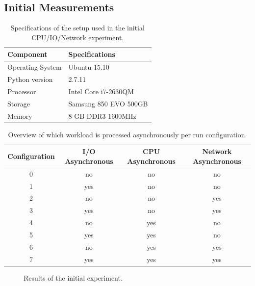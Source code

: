 \subsection{Initial Measurements}

\begin{table}[h]
	\centering
	\caption{Specifications of the setup used in the initial CPU/IO/Network experiment.}
	\label{table:setup_initial_experiment}
	\begin{tabular}{l|l}
		\textbf{Component} 	& \textbf{Specifications} \\ \hline
		Operating System   	& Ubuntu 15.10 \\
		Python version		& 2.7.11 \\
		Processor			& Intel Core i7-2630QM \\ 
		Storage				& Samsung 850 EVO 500GB  \\ 
		Memory				& 8 GB DDR3 1600MHz \\
	\end{tabular}
\end{table}

\begin{table}[]
	\centering
	\caption{Overview of which workload is processed asynchronously per run configuration.}
	\label{tbl:experiment_configuration}
	\begin{tabular}{|c|c|c|c|}
		\hline
		\textbf{Configuration}	& \textbf{I/O Asynchronous} & \textbf{CPU Asynchronous} & \textbf{Network Asynchronous} \\ \hline
		0	& no & no & no \\ \hline
		1	& yes & no & no \\ \hline
		2	& no & no & yes \\ \hline
		3	& yes & no & yes \\ \hline
		4	& no & yes & no \\ \hline
		5	& yes & yes & no \\ \hline
		6	& no & yes & yes \\ \hline
		7	& yes & yes & yes \\ \hline
	\end{tabular}
\end{table}

\begin{figure}[h]
	\caption{Results of the initial experiment.}
	\label{fig:initial_results}
\end{figure}


